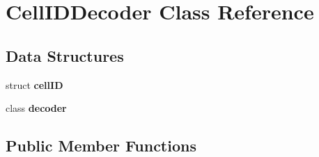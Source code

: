 \section{Cell\-I\-D\-Decoder Class Reference}
\label{classCellIDDecoder}
\subsection*{Data Structures}
\begin{DoxyCompactItemize}
\item 
struct {\bf cell\-I\-D}
\item 
class {\bf decoder}
\end{DoxyCompactItemize}
\subsection*{Public Member Functions}

